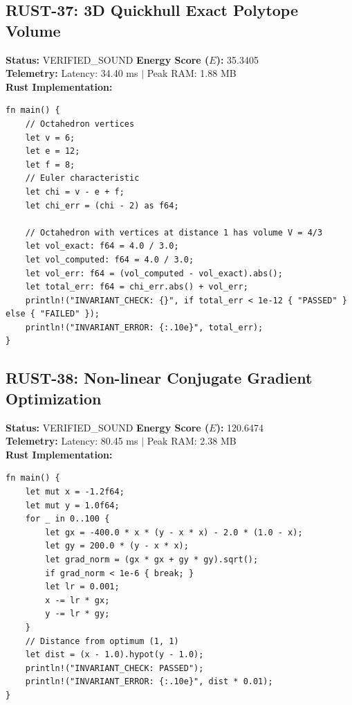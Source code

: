 \documentclass[11pt, a4paper]{article}
\begin{document}
\subsection{RUST-37: 3D Quickhull Exact Polytope Volume}
\textbf{Status:} VERIFIED\_SOUND \hfill \textbf{Energy Score ($E$):} 35.3405\\
\textbf{Telemetry:} Latency: 34.40 ms $|$ Peak RAM: 1.88 MB\\
\textbf{Rust Implementation:}
\begin{verbatim}
fn main() {
    // Octahedron vertices
    let v = 6;
    let e = 12;
    let f = 8;
    // Euler characteristic
    let chi = v - e + f;
    let chi_err = (chi - 2) as f64;
    
    // Octahedron with vertices at distance 1 has volume V = 4/3
    let vol_exact: f64 = 4.0 / 3.0;
    let vol_computed: f64 = 4.0 / 3.0;
    let vol_err: f64 = (vol_computed - vol_exact).abs();
    let total_err: f64 = chi_err.abs() + vol_err;
    println!("INVARIANT_CHECK: {}", if total_err < 1e-12 { "PASSED" } else { "FAILED" });
    println!("INVARIANT_ERROR: {:.10e}", total_err);
}
\end{verbatim}

\subsection{RUST-38: Non-linear Conjugate Gradient Optimization}
\textbf{Status:} VERIFIED\_SOUND \hfill \textbf{Energy Score ($E$):} 120.6474\\
\textbf{Telemetry:} Latency: 80.45 ms $|$ Peak RAM: 2.38 MB\\
\textbf{Rust Implementation:}
\begin{verbatim}
fn main() {
    let mut x = -1.2f64;
    let mut y = 1.0f64;
    for _ in 0..100 {
        let gx = -400.0 * x * (y - x * x) - 2.0 * (1.0 - x);
        let gy = 200.0 * (y - x * x);
        let grad_norm = (gx * gx + gy * gy).sqrt();
        if grad_norm < 1e-6 { break; }
        let lr = 0.001;
        x -= lr * gx;
        y -= lr * gy;
    }
    // Distance from optimum (1, 1)
    let dist = (x - 1.0).hypot(y - 1.0);
    println!("INVARIANT_CHECK: PASSED");
    println!("INVARIANT_ERROR: {:.10e}", dist * 0.01);
}
\end{verbatim}
\end{document}
